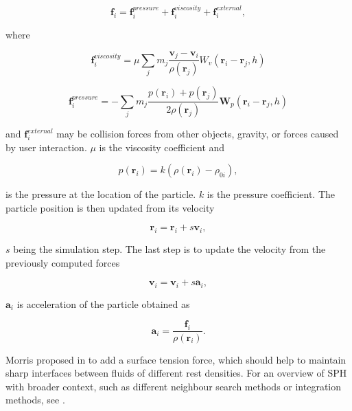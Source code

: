 \documentclass[a4paper,report]{IEEEtran}
\begin{document}
\begin{equation}
	\mathbf{f}_i = \mathbf{f}_{i}^{pressure} + \mathbf{f}_{i}^{viscosity} + \mathbf{f}_{i}^{external},
\end{equation}

where 

\begin{equation}
	\mathbf{f}_{i}^{viscosity} = \mu\sum_{j}m_j\frac{\mathbf{v}_j-\mathbf{v}_i}{\rho(\mathbf{r}_j)} W_v(\mathbf{r}_i-\mathbf{r}_j, h)
\end{equation}

\begin{equation}
	\mathbf{f}_{i}^{pressure} = -\sum_{j}m_j\frac{p(\mathbf{r}_i)+p(\mathbf{r}_j)}{2\rho(\mathbf{r}_j)} \mathbf{W}_p(\mathbf{r}_i-\mathbf{r}_j, h)
\end{equation}

and $\mathbf{f}_{i}^{external}$ may be collision forces from other objects, gravity, or forces caused by user interaction. $\mu$ is the viscosity coefficient and 

\begin{equation}
	p(\mathbf{r}_i) = k(\rho(\mathbf{r}_i)-\rho_{0i}),
\end{equation}

is the pressure at the location of the particle. $k$ is the pressure coefficient. The particle position is then updated from its velocity 

\begin{equation}
	\mathbf{r}_i = \mathbf{r}_i + s\mathbf{v}_i,
\end{equation}

$s$ being the simulation step. The last step is to update the velocity from the previously computed forces

\begin{equation}
	\mathbf{v}_i = \mathbf{v}_i + s\mathbf{a}_i,
\end{equation}

$\mathbf{a}_i$ is acceleration of the particle obtained as

\begin{equation}
	\mathbf{a}_i = \frac{\mathbf{f}_{i}}{\rho(\mathbf{r}_{i})}.
\end{equation}

Morris proposed in \cite{Articles:Morris} to add a surface tension force, which should help to maintain sharp interfaces between fluids of different rest densities. For an overview of SPH with broader context, such as different neighbour search methods or integration methods, see \cite{Articles:Ertekin}.
\end{document}
